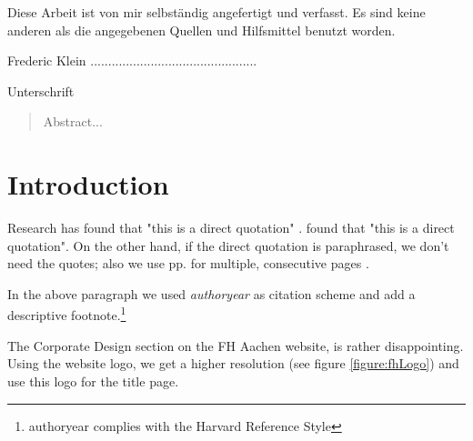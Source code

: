
%



	
\restoregeometry


\clearpage
\vspace*{\fill}
\begin{center}
	\begin{minipage}{.8\textwidth}
		\thispagestyle{empty} %
		Diese Arbeit ist von mir selbst\"andig angefertigt und verfasst. Es sind keine anderen als die angegebenen Quellen und Hilfsmittel benutzt worden.\par
		\vspace{1cm}
		Frederic Klein ...............................................\par
		Unterschrift
	\end{minipage}
\end{center}
\vfill %
\clearpage


\begin{abstract}
	\thispagestyle{plain}
	\setcounter{page}{1}
	Abstract...
\end{abstract}

\tableofcontents
\setcounter{page}{2}
\listoffigures

\chapter{Introduction}
Research has found that "this is a direct quotation" \autocite[p. 1]{Doe:1}. \textcite[p. 1]{Doe:1} found that "this is a direct quotation". On the other hand, if the direct quotation is paraphrased, we don't need the quotes; also we use pp. for multiple, consecutive pages \autocite[pp. 35-37]{Doe:2}.\par

In the above paragraph we used \textit{authoryear} as citation scheme and add a descriptive footnote.\footnote{authoryear complies with the Harvard Reference Style}\par

The Corporate Design section on the FH Aachen website, is rather disappointing. Using the website logo, we get a higher resolution (see figure \ref{figure:fhLogo}) and use this logo for the title page.\par

